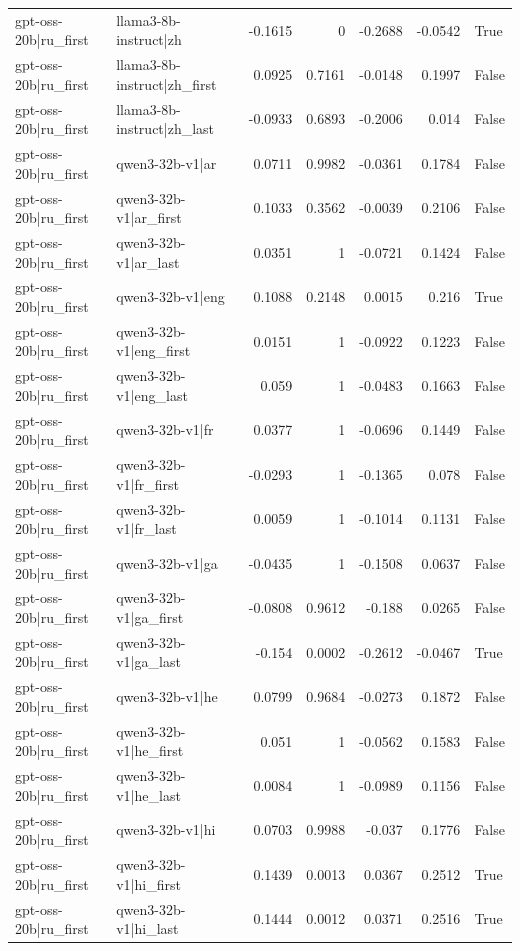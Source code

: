 \begin{table}
\begin{tabular}{l l r r r r l}
gpt-oss-20b|ru_first & llama3-8b-instruct|zh & -0.1615 & 0 & -0.2688 & -0.0542 & True \\
gpt-oss-20b|ru_first & llama3-8b-instruct|zh_first & 0.0925 & 0.7161 & -0.0148 & 0.1997 & False \\
gpt-oss-20b|ru_first & llama3-8b-instruct|zh_last & -0.0933 & 0.6893 & -0.2006 & 0.014 & False \\
gpt-oss-20b|ru_first & qwen3-32b-v1|ar & 0.0711 & 0.9982 & -0.0361 & 0.1784 & False \\
gpt-oss-20b|ru_first & qwen3-32b-v1|ar_first & 0.1033 & 0.3562 & -0.0039 & 0.2106 & False \\
gpt-oss-20b|ru_first & qwen3-32b-v1|ar_last & 0.0351 & 1 & -0.0721 & 0.1424 & False \\
gpt-oss-20b|ru_first & qwen3-32b-v1|eng & 0.1088 & 0.2148 & 0.0015 & 0.216 & True \\
gpt-oss-20b|ru_first & qwen3-32b-v1|eng_first & 0.0151 & 1 & -0.0922 & 0.1223 & False \\
gpt-oss-20b|ru_first & qwen3-32b-v1|eng_last & 0.059 & 1 & -0.0483 & 0.1663 & False \\
gpt-oss-20b|ru_first & qwen3-32b-v1|fr & 0.0377 & 1 & -0.0696 & 0.1449 & False \\
gpt-oss-20b|ru_first & qwen3-32b-v1|fr_first & -0.0293 & 1 & -0.1365 & 0.078 & False \\
gpt-oss-20b|ru_first & qwen3-32b-v1|fr_last & 0.0059 & 1 & -0.1014 & 0.1131 & False \\
gpt-oss-20b|ru_first & qwen3-32b-v1|ga & -0.0435 & 1 & -0.1508 & 0.0637 & False \\
gpt-oss-20b|ru_first & qwen3-32b-v1|ga_first & -0.0808 & 0.9612 & -0.188 & 0.0265 & False \\
gpt-oss-20b|ru_first & qwen3-32b-v1|ga_last & -0.154 & 0.0002 & -0.2612 & -0.0467 & True \\
gpt-oss-20b|ru_first & qwen3-32b-v1|he & 0.0799 & 0.9684 & -0.0273 & 0.1872 & False \\
gpt-oss-20b|ru_first & qwen3-32b-v1|he_first & 0.051 & 1 & -0.0562 & 0.1583 & False \\
gpt-oss-20b|ru_first & qwen3-32b-v1|he_last & 0.0084 & 1 & -0.0989 & 0.1156 & False \\
gpt-oss-20b|ru_first & qwen3-32b-v1|hi & 0.0703 & 0.9988 & -0.037 & 0.1776 & False \\
gpt-oss-20b|ru_first & qwen3-32b-v1|hi_first & 0.1439 & 0.0013 & 0.0367 & 0.2512 & True \\
gpt-oss-20b|ru_first & qwen3-32b-v1|hi_last & 0.1444 & 0.0012 & 0.0371 & 0.2516 & True \\

\end{tabular}
\end{table}
